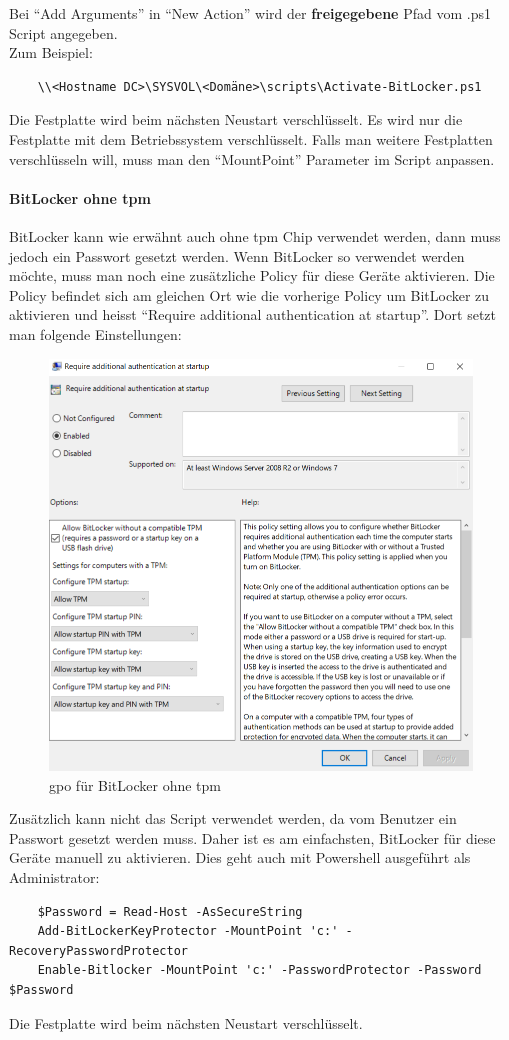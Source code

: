 Bei ``Add Arguments'' in ``New Action'' wird der \textbf{freigegebene} Pfad vom .ps1 Script angegeben.\\
Zum Beispiel:
\begin{lstlisting}
    \\<Hostname DC>\SYSVOL\<Domäne>\scripts\Activate-BitLocker.ps1
\end{lstlisting}

Die Festplatte wird beim nächsten Neustart verschlüsselt.
Es wird nur die Festplatte mit dem Betriebssystem verschlüsselt.
Falls man weitere Festplatten verschlüsseln will, muss man den ``MountPoint'' Parameter im Script anpassen.

\paragraph{BitLocker ohne \acrshort{tpm}}
BitLocker kann wie erwähnt auch ohne \acrshort{tpm} Chip verwendet werden, dann muss jedoch ein Passwort gesetzt werden.
Wenn BitLocker so verwendet werden möchte, muss man noch eine zusätzliche Policy für diese Geräte aktivieren.
Die Policy befindet sich am gleichen Ort wie die vorherige Policy um BitLocker zu aktivieren und heisst ``Require additional authentication at startup''.
Dort setzt man folgende Einstellungen:
\begin{figure}[H]
    \centering
    \includegraphics[width=0.7\linewidth]{../img/Encryption/computers-without-tpm.png}
    \caption{\acrshort{gpo} für BitLocker ohne \acrshort{tpm}}
\end{figure}
Zusätzlich kann nicht das Script verwendet werden, da vom Benutzer ein Passwort gesetzt werden muss.
Daher ist es am einfachsten, BitLocker für diese Geräte manuell zu aktivieren.
Dies geht auch mit Powershell ausgeführt als Administrator:
\begin{lstlisting}
    $Password = Read-Host -AsSecureString
    Add-BitLockerKeyProtector -MountPoint 'c:' -RecoveryPasswordProtector
    Enable-Bitlocker -MountPoint 'c:' -PasswordProtector -Password $Password
\end{lstlisting}
Die Festplatte wird beim nächsten Neustart verschlüsselt.


